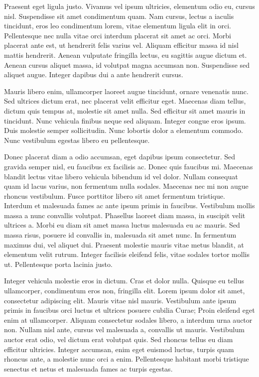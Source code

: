 \documentclass{article}
\begin{document}
Praesent eget ligula justo. Vivamus vel ipsum ultricies, elementum odio eu, cursus nisl. Suspendisse sit amet condimentum quam. Nam cursus, lectus a iaculis tincidunt, eros leo condimentum lorem, vitae elementum ligula elit in orci. Pellentesque nec nulla vitae orci interdum placerat sit amet ac orci. Morbi placerat ante est, ut hendrerit felis varius vel. Aliquam efficitur massa id nisl mattis hendrerit. Aenean vulputate fringilla lectus, eu sagittis augue dictum et. Aenean cursus aliquet massa, id volutpat magna accumsan non. Suspendisse sed aliquet augue. Integer dapibus dui a ante hendrerit cursus.

Mauris libero enim, ullamcorper laoreet augue tincidunt, ornare venenatis nunc. Sed ultrices dictum erat, nec placerat velit efficitur eget. Maecenas diam tellus, dictum quis tempus at, molestie sit amet nulla. Sed efficitur sit amet mauris in tincidunt. Nunc vehicula finibus neque sed aliquam. Integer congue eros ipsum. Duis molestie semper sollicitudin. Nunc lobortis dolor a elementum commodo. Nunc vestibulum egestas libero eu pellentesque.

Donec placerat diam a odio accumsan, eget dapibus ipsum consectetur. Sed gravida semper nisl, eu faucibus ex facilisis ac. Donec quis faucibus mi. Maecenas blandit lectus vitae libero vehicula bibendum id vel dolor. Nullam consequat quam id lacus varius, non fermentum nulla sodales. Maecenas nec mi non augue rhoncus vestibulum. Fusce porttitor libero sit amet fermentum tristique. Interdum et malesuada fames ac ante ipsum primis in faucibus. Vestibulum mollis massa a nunc convallis volutpat. Phasellus laoreet diam massa, in suscipit velit ultrices a. Morbi eu diam sit amet massa luctus malesuada eu ac mauris. Sed massa risus, posuere id convallis in, malesuada sit amet nunc. In fermentum maximus dui, vel aliquet dui. Praesent molestie mauris vitae metus blandit, at elementum velit rutrum. Integer facilisis eleifend felis, vitae sodales tortor mollis ut. Pellentesque porta lacinia justo.

Integer vehicula molestie eros in dictum. Cras et dolor nulla. Quisque eu tellus ullamcorper, condimentum eros non, fringilla elit. Lorem ipsum dolor sit amet, consectetur adipiscing elit. Mauris vitae nisl mauris. Vestibulum ante ipsum primis in faucibus orci luctus et ultrices posuere cubilia Curae; Proin eleifend eget enim at ullamcorper. Aliquam consectetur sodales libero, a interdum urna auctor non. Nullam nisl ante, cursus vel malesuada a, convallis ut mauris. Vestibulum auctor erat odio, vel dictum erat volutpat quis. Sed rhoncus tellus eu diam efficitur ultricies. Integer accumsan, enim eget euismod luctus, turpis quam rhoncus ante, a molestie nunc orci a enim. Pellentesque habitant morbi tristique senectus et netus et malesuada fames ac turpis egestas.
\end{document}
